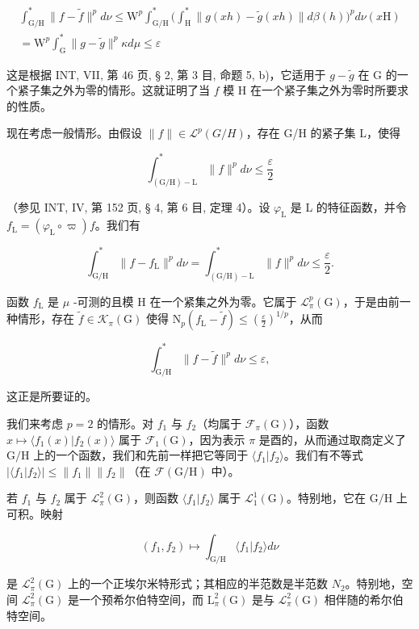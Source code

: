\[
\begin{array}{c} \int_ {\mathrm{G/H}} ^ {*} \| f - \widetilde {f} \| ^ {p} d \nu \leqslant \mathrm{W} ^ {p} \int_ {\mathrm{G/H}} ^ {*} \Big (\int_ {\mathrm{H}} ^ {*} \| g (x h) - \widetilde {g} (x h) \| d \beta (h) \Big) ^ {p} d \nu (x \mathrm{H}) \\ = \mathrm{W} ^ {p} \int_ {\mathrm{G}} ^ {*} \| g - \widetilde {g} \| ^ {p} \kappa d \mu \leqslant \varepsilon \end{array}
\]

这是根据 INT, VII, 第 46 页, § 2, 第 3 目, 命题 5, b)，它适用于 \(g - \widetilde{g}\) 在 G 的一个紧子集之外为零的情形。这就证明了当 \(f\) 模 H 在一个紧子集之外为零时所要求的性质。

现在考虑一般情形。由假设 \(\|f\|\in\mathcal{L}^{p}(G/H)\)，存在 G/H 的紧子集 L，使得

\[
\int_ {(\mathrm{G} / \mathrm{H}) - \mathrm{L}} ^ {*} \| f \| ^ {p} d \nu \leqslant \frac {\varepsilon}{2}
\]

（参见 INT, IV, 第 152 页, § 4, 第 6 目, 定理 4）。设 \(\varphi_{\mathrm{L}}\) 是 L 的特征函数，并令 \(f_{\mathrm{L}} = (\varphi_{\mathrm{L}} \circ \varpi)f\)。我们有

\[
\int_ {\mathrm{G} / \mathrm{H}} ^ {*} \| f - f _ {\mathrm{L}} \| ^ {p} d \nu = \int_ {(\mathrm{G} / \mathrm{H}) - \mathrm{L}} ^ {*} \| f \| ^ {p} d \nu \leqslant \frac {\varepsilon}{2}.
\]

函数 \(f_{\mathrm{L}}\) 是 \(\mu\) -可测的且模 H 在一个紧集之外为零。它属于 \(\mathcal{L}_{\pi}^{p}(\mathrm{G})\)，于是由前一种情形，存在 \(\widetilde{f} \in \mathcal{K}_{\pi}(\mathrm{G})\) 使得 \(\mathrm{N}_p(f_{\mathrm{L}} - \widetilde{f}) \leqslant (\frac{\varepsilon}{2})^{1/p}\)，从而

\[
\int_ {\mathrm{G/H}} ^ {*} \| f - \widetilde {f} \| ^ {p} d \nu \leqslant \varepsilon ,
\]

这正是所要证的。

 我们来考虑 \(p = 2\) 的情形。对 \(f_1\) 与 \(f_2\)（均属于 \(\mathcal{F}_{\pi}(\mathrm{G})\)），函数 \(x \mapsto \langle f_1(x) | f_2(x) \rangle\) 属于 \(\mathcal{F}_1(\mathrm{G})\)，因为表示 \(\pi\) 是酉的，从而通过取商定义了 \(\mathrm{G / H}\) 上的一个函数，我们和先前一样把它等同于 \(\langle f_1 | f_2 \rangle\)。我们有不等式 \(|\langle f_1 | f_2 \rangle| \leqslant \| f_1 \| \| f_2 \|\)（在 \(\mathcal{F}(\mathrm{G / H})\) 中）。

若 \(f_1\) 与 \(f_2\) 属于 \(\mathcal{L}_\pi^2(\mathrm{G})\)，则函数 \(\langle f_1 | f_2 \rangle\) 属于 \(\mathcal{L}_1^1(\mathrm{G})\)。特别地，它在 \(\mathrm{G/H}\) 上可积。映射

\[
(f _ {1}, f _ {2}) \mapsto \int_ {\mathrm{G} / \mathrm{H}} \langle f _ {1} | f _ {2} \rangle d \nu
\]

是 \(\mathcal{L}_{\pi}^{2}(\mathrm{G})\) 上的一个正埃尔米特形式；其相应的半范数是半范数 \(N_{2}\)。特别地，空间 \(\mathcal{L}_{\pi}^{2}(\mathrm{G})\) 是一个预希尔伯特空间，而 \(\mathrm{L}_{\pi}^{2}(\mathrm{G})\) 是与 \(\mathcal{L}_{\pi}^{2}(\mathrm{G})\) 相伴随的希尔伯特空间。

